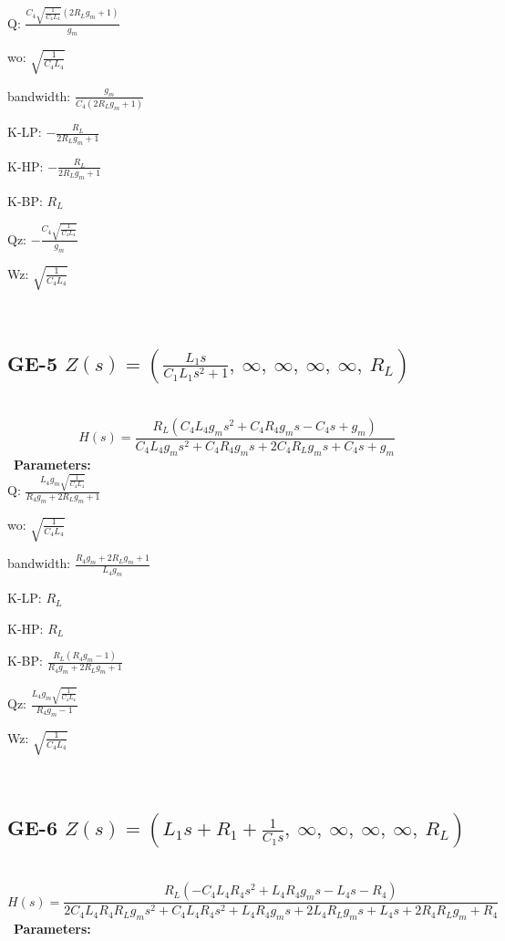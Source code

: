 \documentclass{article}
\begin{document}
Q: $\frac{C_{4} \sqrt{\frac{1}{C_{4} L_{4}}} \left(2 R_{L} g_{m} + 1\right)}{g_{m}}$\ 

wo: $\sqrt{\frac{1}{C_{4} L_{4}}}$\ 

bandwidth: $\frac{g_{m}}{C_{4} \left(2 R_{L} g_{m} + 1\right)}$\ 

K-LP: $- \frac{R_{L}}{2 R_{L} g_{m} + 1}$\ 

K-HP: $- \frac{R_{L}}{2 R_{L} g_{m} + 1}$\ 

K-BP: $R_{L}$\ 

Qz: $- \frac{C_{4} \sqrt{\frac{1}{C_{4} L_{4}}}}{g_{m}}$\ 

Wz: $\sqrt{\frac{1}{C_{4} L_{4}}}$\ 

\ 

\subsection{GE-5 $Z(s) = \left( \frac{L_{1} s}{C_{1} L_{1} s^{2} + 1}, \  \infty, \  \infty, \  \infty, \  \infty, \  R_{L}\right)$ } \ 
\textbf{\[H(s) = \frac{R_{L} \left(C_{4} L_{4} g_{m} s^{2} + C_{4} R_{4} g_{m} s - C_{4} s + g_{m}\right)}{C_{4} L_{4} g_{m} s^{2} + C_{4} R_{4} g_{m} s + 2 C_{4} R_{L} g_{m} s + C_{4} s + g_{m}}\] } \ 
\textbf{Parameters:}\\ 

Q: $\frac{L_{4} g_{m} \sqrt{\frac{1}{C_{4} L_{4}}}}{R_{4} g_{m} + 2 R_{L} g_{m} + 1}$\ 

wo: $\sqrt{\frac{1}{C_{4} L_{4}}}$\ 

bandwidth: $\frac{R_{4} g_{m} + 2 R_{L} g_{m} + 1}{L_{4} g_{m}}$\ 

K-LP: $R_{L}$\ 

K-HP: $R_{L}$\ 

K-BP: $\frac{R_{L} \left(R_{4} g_{m} - 1\right)}{R_{4} g_{m} + 2 R_{L} g_{m} + 1}$\ 

Qz: $\frac{L_{4} g_{m} \sqrt{\frac{1}{C_{4} L_{4}}}}{R_{4} g_{m} - 1}$\ 

Wz: $\sqrt{\frac{1}{C_{4} L_{4}}}$\ 

\ 

\subsection{GE-6 $Z(s) = \left( L_{1} s + R_{1} + \frac{1}{C_{1} s}, \  \infty, \  \infty, \  \infty, \  \infty, \  R_{L}\right)$ } \ 
\textbf{\[H(s) = \frac{R_{L} \left(- C_{4} L_{4} R_{4} s^{2} + L_{4} R_{4} g_{m} s - L_{4} s - R_{4}\right)}{2 C_{4} L_{4} R_{4} R_{L} g_{m} s^{2} + C_{4} L_{4} R_{4} s^{2} + L_{4} R_{4} g_{m} s + 2 L_{4} R_{L} g_{m} s + L_{4} s + 2 R_{4} R_{L} g_{m} + R_{4}}\] } \ 
\textbf{Parameters:}\\ 
\end{document}
